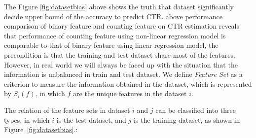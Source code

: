 \fi

The Figure \ref{fig:datasetbias} above shows the truth that dataset significantly decide upper bound of the accuracy to predict CTR. above performance comparison of binary feature and counting feature on CTR estimation reveals that performance of counting feature using non-linear regression model is comparable to that of binary feature using linear regression model, the precondition is that the training and test dataset share most of the features. However, in real world we will always be faced up with the situation that the information is unbalanced in train and test dataset. We define \textit{Feature Set} as a criterion to measure the information obtained in the dataset, which is represented by  \(S_i(f)\), in which \(f\) are the unique features in the dataset \(i\).

The relation of the feature sets in dataset \(i\) and \(j\) can be classified into three types, in which \(i\) is the test dataset, and \(j\) is the training dataset, as shown in Figure~\ref{fig:datasetbias}.:
